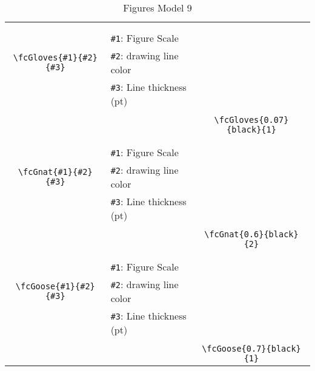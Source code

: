 \documentclass{article}
\begin{document}
\begin{table}[H]
\begin{tabular}{|c|l|c|}
	&&\multirow{5}{*}{\fcGloves{0.07}{black}{1}}\\	&&\\	&\verb|#1|: Figure Scale &\\	\verb|\fcGloves{#1}{#2}{#3}|&	\verb|#2|: drawing line color &\\	&\verb|#3|: Line thickness (pt) &\\ &&\\&&	\verb|\fcGloves{0.07}{black}{1}|\\\hline 	
	&&\multirow{5}{*}{\fcGnat{0.6}{black}{2}}\\	&&\\	&\verb|#1|: Figure Scale &\\	\verb|\fcGnat{#1}{#2}{#3}|&	\verb|#2|: drawing line color &\\	&\verb|#3|: Line thickness (pt) &\\ &&\\&&	\verb|\fcGnat{0.6}{black}{2}|\\\hline 	
	&&\multirow{5}{*}{\fcGoose{0.7}{black}{1}}\\	&&\\	&\verb|#1|: Figure Scale &\\	\verb|\fcGoose{#1}{#2}{#3}|&	\verb|#2|: drawing line color &\\	&\verb|#3|: Line thickness (pt) &\\ &&\\&&	\verb|\fcGoose{0.7}{black}{1}|\\\hline 	\hline\end{tabular}\caption{Figures Model 9}\label{tab9}\end{table}
\end{document}
